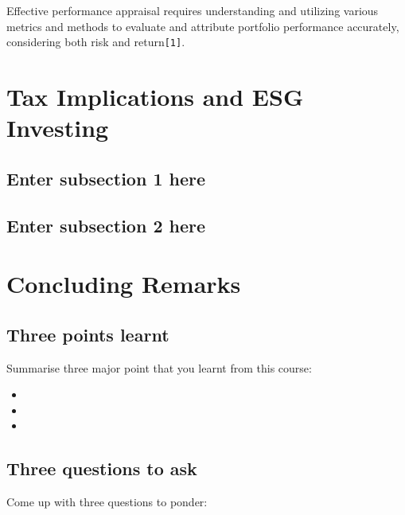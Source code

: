 \documentclass[
]{book}
\providecommand{\tightlist}{%
  \setlength{\itemsep}{0pt}\setlength{\parskip}{0pt}}
\begin{document}
Effective performance appraisal requires understanding and utilizing various metrics and methods to evaluate and attribute portfolio performance accurately, considering both risk and return\texttt{{[}1{]}}.

\hypertarget{ch9}{%
\chapter{Tax Implications and ESG Investing}\label{ch9}}

\hypertarget{enter-subsection-1-here}{%
\section{Enter subsection 1 here}\label{enter-subsection-1-here}}

\hypertarget{enter-subsection-2-here}{%
\section{Enter subsection 2 here}\label{enter-subsection-2-here}}

\hypertarget{concluding-remarks}{%
\chapter*{Concluding Remarks}\label{concluding-remarks}}

\hypertarget{three-points-learnt}{%
\section*{Three points learnt}\label{three-points-learnt}}

Summarise three major point that you learnt from this course:

\begin{itemize}
\tightlist
\item
\item
\item
\end{itemize}

\hypertarget{three-questions-to-ask}{%
\section*{Three questions to ask}\label{three-questions-to-ask}}

Come up with three questions to ponder:
\end{document}
